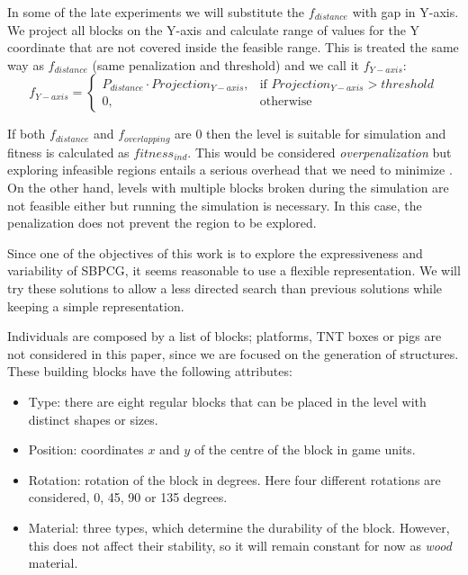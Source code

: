 \documentclass[runningheads,a4paper]{llncs}
\begin{document}
In some of the late experiments we will substitute the $f_{distance}$ with gap in Y-axis.
We project all blocks on the Y-axis and calculate range of values for the Y coordinate
that are not covered inside the feasible range. This is treated the same way as $f_{distance}$
(same penalization and threshold) and we call it $f_{Y-axis}$:
$$f_{Y-axis} = 
\begin{cases}
P_{distance}\cdot Projection_{Y-axis}, & \text{if } Projection_{Y-axis} > threshold\\
0, & \text{otherwise}
\end{cases}
$$

If both $f_{distance}$ and $f_{overlapping}$ are $0$ then the level is suitable 
for simulation and fitness is calculated as $fitness_{ind}$. This would be 
considered \textit{overpenalization} but exploring infeasible regions entails a 
serious overhead that we need to minimize \cite{runarsson2003evolutionary}. 
On the other hand, levels with 
multiple blocks broken during the simulation are not feasible either but 
running the simulation is necessary. In this case, the penalization does not 
prevent the region to be explored.


Since one of the objectives of this work is to explore the expressiveness 
and variability of SBPCG, it seems reasonable to use a flexible representation. 
We will try these solutions to allow a less directed search than previous solutions while keeping a 
simple representation. 

Individuals are composed by a list of blocks; platforms, TNT boxes or pigs are not considered in this 
paper, since we are focused on the generation of structures. These
building blocks have the following attributes:

\begin{itemize}
	\item Type: there are eight regular blocks that can be placed in the level 
	with distinct shapes or sizes.%
	\item Position: coordinates $x$ and $y$ of the centre of the block in game 
	units.
	\item Rotation: rotation of the block in degrees. Here four different 
	rotations are considered, 0, 45, 90 or 135 degrees.%
        \item Material: three types, which determine the durability 
of the block. However, this does not affect their stability, so it will remain 
constant for now as \textit{wood} material.
\end{itemize}
\end{document}
